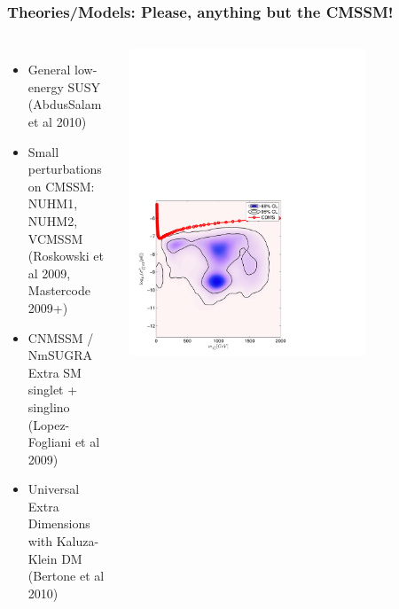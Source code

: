 \documentclass[xcolor=dvipsnames]{beamer}
\begin{document}
\begin{frame}
\frametitle{Theories/Models: Please, anything but the CMSSM!}

\begin{columns}[c]
\begin{itemize}
\item{General low-energy SUSY\\\hspace{3mm}\footnotesize(AbdusSalam et al 2010)}
\item{Small perturbations on CMSSM:\\\hspace{3mm}\footnotesize NUHM1, NUHM2, VCMSSM\\\hspace{3mm}(Roskowski et al 2009, \\\hspace{3mm}Mastercode 2009+)}
\item{CNMSSM / NmSUGRA\\\hspace{3mm}\footnotesize Extra SM singlet + singlino\\\hspace{3mm}(Lopez-Fogliani et al 2009)}
\item{Universal Extra Dimensions\\\hspace{3mm}\footnotesize with Kaluza-Klein DM\\\hspace{3mm}(Bertone et al 2010)}
\end{itemize}
\centering
\includegraphics[width=0.73\textwidth, trim = 0 0 150 390, clip = true]{pMSSMSI}\\

\end{columns}
\end{frame}
\end{document}
